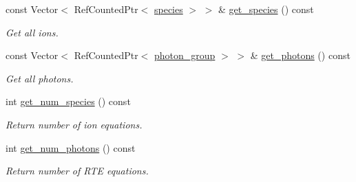 \begin{DoxyCompactItemize}
const Vector$<$ Ref\+Counted\+Ptr$<$ \hyperlink{classspecies}{species} $>$ $>$ \& \hyperlink{classplasma__kinetics_a93f37413099441a8d6aacc861ba0e753}{get\+\_\+species} () const 
\begin{DoxyCompactList}\small\item\em Get all ions. \end{DoxyCompactList}\item 
const Vector$<$ Ref\+Counted\+Ptr$<$ \hyperlink{classphoton__group}{photon\+\_\+group} $>$ $>$ \& \hyperlink{classplasma__kinetics_a94da4a53f3693a48a4e787df69ba761f}{get\+\_\+photons} () const 
\begin{DoxyCompactList}\small\item\em Get all photons. \end{DoxyCompactList}\item 
int \hyperlink{classplasma__kinetics_a73858d2fa55e6f2ab4da7a10ad278374}{get\+\_\+num\+\_\+species} () const 
\begin{DoxyCompactList}\small\item\em Return number of ion equations. \end{DoxyCompactList}\item 
int \hyperlink{classplasma__kinetics_af6c197d4049d0d7cbe586010ced3e54d}{get\+\_\+num\+\_\+photons} () const 
\begin{DoxyCompactList}\small\item\em Return number of R\+TE equations. \end{DoxyCompactList}\end{DoxyCompactItemize}
